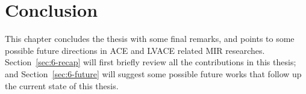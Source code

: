 

\chapter{Conclusion}\label{cp:conclude} %

%



\ifpdf
    \graphicspath{{8/figures/PNG/}{8/figures/PDF/}{8/figures/}}
\else
    \graphicspath{{8/figures/EPS/}{8/figures/}}
\fi


This chapter concludes the thesis with some final remarks, and points to some possible future directions in ACE and LVACE related MIR researches. Section~\ref{sec:6-recap} will first briefly review all the contributions in this thesis; and Section~\ref{sec:6-future} will suggest some possible future works that follow up the current state of this thesis.

